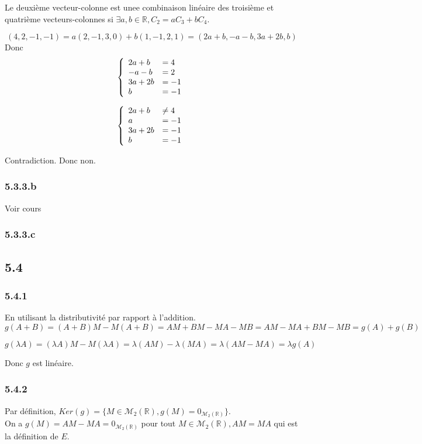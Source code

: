 \documentclass[]{book}
\theoremstyle{definition}
\newcommand{\bb}[1]{\mathbb{#1}}
\newcommand{\R}{\bb{R}}
\begin{document}
Le deuxi\`eme vecteur-colonne est unee combinaison lin\'eaire des troisi\`eme et quatri\`eme vecteurs-colonnes si $\exists a,b \in \R, C_2 = aC_3+bC_4$.

$$
(4,2,-1,-1) = a(2,-1,3,0) + b(1,-1,2,1) = (2a+b,-a-b,3a+2b,b)
$$
Donc
$$
\left\{ 
\begin{array}{l l}
2a+b & = 4 \\
-a-b & = 2\\
3a+2b & = -1 \\
b & = -1 \\
\end{array}
\right. 
$$

$$
\left\{ 
\begin{array}{l l}
2a+b & \neq 4 \\
a & = -1\\
3a+2b & = -1 \\
b & = -1 \\
\end{array}
\right. 
$$

Contradiction. Donc non.

\subsubsection*{5.3.3.b}	
Voir cours

\subsubsection*{5.3.3.c}	


\subsection*{5.4}	
\subsubsection*{5.4.1}	
En utilisant la distributivit\'e par rapport \`a l'addition.
$$g(A+B) = (A+B)M - M(A+B) = AM+BM -MA -MB = AM -MA +BM -MB = g(A) + g(B)$$

$$g(\lambda A) = (\lambda A)M - M(\lambda A) = \lambda (AM) - \lambda(MA) = \lambda (AM-MA) = \lambda g(A)$$

Donc $g$ est lin\'eaire.

\subsubsection*{5.4.2}	
Par d\'efinition, $Ker(g) = \{ M \in \mathcal{M}_2(\R), g(M) = 0_{\mathcal{M}_2(\R)}\}$.\\
On a $g(M) = AM - MA = 0_{\mathcal{M}_2(\R)}$ pour tout $M \in \mathcal{M}_2(\R), AM=MA$ qui est la d\'efinition de $E$.\\
\end{document}
